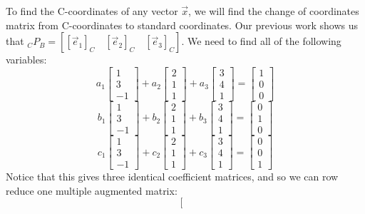 \documentclass[10pt,letter]{article}
\begin{document}
To find the C-coordinates of any vector $\vec{x}$, we will find the change of coordinates matrix from C-coordinates to standard coordinates. Our previous work shows us that $_CP_B=\left[[\vec{e}_1]_C\quad[\vec{e}_2]_C\quad[\vec{e}_3]_C\right]$. We need to find all of the following variables: $$a_1\begin{bmatrix}1\\3\\-1\end{bmatrix}+a_2\begin{bmatrix}2\\1\\1\end{bmatrix}+a_3\begin{bmatrix}3\\4\\1\end{bmatrix}=\begin{bmatrix}1\\0\\0\end{bmatrix}$$$$b_1\begin{bmatrix}1\\3\\-1\end{bmatrix}+b_2\begin{bmatrix}2\\1\\1\end{bmatrix}+b_3\begin{bmatrix}3\\4\\1\end{bmatrix}=\begin{bmatrix}0\\1\\0\end{bmatrix}$$$$c_1\begin{bmatrix}1\\3\\-1\end{bmatrix}+c_2\begin{bmatrix}2\\1\\1\end{bmatrix}+c_3\begin{bmatrix}3\\4\\1\end{bmatrix}=\begin{bmatrix}0\\0\\1\end{bmatrix}$$ Notice that this gives three identical coefficient matrices, and so we can row reduce one multiple augmented matrix: $$\left[\begin{array}{rrr|rrr}

\end{array}$$
\end{document}
